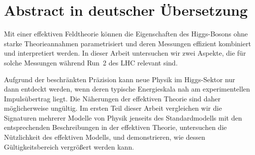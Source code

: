 


\chapter*{Abstract in deutscher \"{U}bersetzung}





Mit einer effektiven Feldtheorie k\"onnen die Eigenschaften des
Higgs-Bosons ohne starke Theorieannahmen parametrisiert und deren
Messungen effizient kombiniert und interpretiert werden. In dieser
Arbeit untersuchen wir zwei Aspekte, die f\"ur solche Messungen
w\"ahrend Run~2 des LHC relevant sind.

Aufgrund der beschr\"ankten Pr\"azision kann neue Physik im
Higgs-Sektor nur dann entdeckt werden, wenn deren typische
Energieskala nah am experimentellen Impuls\"ubertrag liegt. Die
N\"aherungen der effektiven Theorie sind daher m\"oglicherweise
ung\"ultig. Im ersten Teil dieser Arbeit vergleichen wir die
Signaturen mehrerer Modelle von Physik jenseits des Standardmodells
mit den entsprechenden Beschreibungen in der effektiven Theorie,
untersuchen die N\"utzlichkeit des effektiven Modells, und
demonstrieren, wie dessen G\"ultigkeitsbereich vergr\"o\ss{}ert werden
kann.

